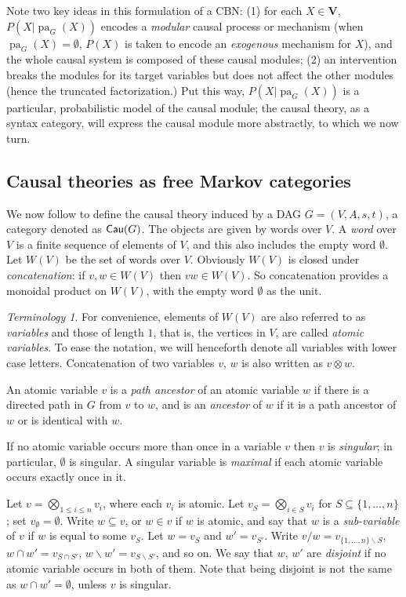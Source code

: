 \documentclass[12pt]{amsart}
\theoremstyle{plain}
\theoremstyle{definition}
\theoremstyle{remark}
\newtheorem{ter}[thm]{Terminology}
\numberwithin{equation}{section}
\theoremstyle{plain}
\newcommand{\0}{\emptyset}
\newcommand{\sub}{\subseteq}
\newcommand{\mi}{\smallsetminus}
\newcommand{\cat}[1]{\textup{\textsf{#1}}}
\DeclareMathOperator{\pa}{pa}
\newcommand{\memph}[1]{{\color{magenta}\emph{#1}}}
\begin{document}
Note two key ideas in this formulation of a CBN: (1) for each $X\in \mathbf{V}$, $P(X|\pa_G(X))$ encodes a \memph{modular} causal process or mechanism (when $\pa_G(X)=\emptyset$, $P(X)$ is taken to encode an \memph{exogenous} mechanism for $X$), and the whole causal system is composed of these causal modules; (2) an intervention breaks the modules for its target variables but does not affect the other modules (hence the truncated factorization.) Put this way, $P(X|\pa_G(X))$ is a particular, probabilistic model of the causal module; the causal theory, as a syntax category, will express the causal module more abstractly, to which we now turn.

\subsection{Causal theories as free Markov categories}
\label{subsec:cau}
We now follow \cite{Fong:thesis} to define the causal theory induced by a DAG $G = (V, A, s, t)$, a category denoted as $\cat{Cau}(G)$. The objects are given by words over $V$. A \memph{word} over $V$ is a finite sequence of elements of $V$, and this also includes the empty word $\0$. Let $W(V)$ be the set of words over $V$. Obviously $W(V)$ is closed under \memph{concatenation}: if $v, w \in W(V)$ then $vw \in W(V)$.  So concatenation provides a monoidal product on $W(V)$, with the empty word $\0$ as the unit.


\begin{ter}\label{graph:bas}
For convenience, elements of $W(V)$ are also referred to as \memph{variables} and those of length $1$, that is, the vertices in $V$, are called \memph{atomic variables}. To ease the notation, we will henceforth denote all variables with lower case letters. Concatenation of two variables $v$, $w$ is also written as $v \otimes w$.

An atomic variable $v$ is a \memph{path ancestor} of an atomic variable $w$ if there is a directed path in $G$ from $v$ to $w$, and is an \memph{ancestor} of $w$ if it is a path ancestor of $w$ or is identical with $w$.

If no atomic variable occurs more than once in a variable $v$ then $v$ is \memph{singular}; in particular, $\0$ is singular. A singular variable is \memph{maximal} if  each atomic variable occurs exactly once in it.

Let $v = \bigotimes_{1 \leq i \leq n} v_i$, where each $v_i$ is atomic. Let $v_S = \bigotimes_{i \in S} v_i$ for $S \sub \{1, \ldots, n\}$; set $v_\0 = \0$. Write $w \sub v$, or $w \in v$ if $w$ is  atomic, and say that $w$ is a \memph{sub-variable} of $v$ if  $w$ is equal to some $v_S$. Let $w = v_S$ and $w' = v_{S'}$. Write $v/w = v_{\{1, \ldots, n\} \mi S}$, $w \cap w' = v_{S \cap S'}$, $w \mi w' = v_{S \mi S'}$, and so on. We say that $w$, $w'$ are \memph{disjoint} if no atomic variable occurs in both of them.  Note that being disjoint is not the same as $w \cap w' = \0$,  unless $v$ is singular.
\end{ter}
\end{document}
